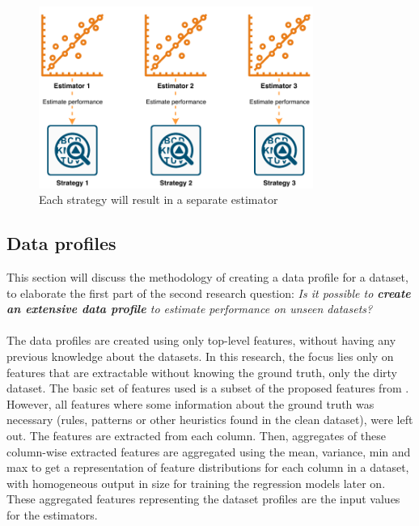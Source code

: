 \begin{figure}[h]
	\centering
	\includegraphics[width=0.8\textwidth]{thesis/Figures/Method/PerformanceEstimation-OnlyEstimate.pdf}
	\caption{Each strategy will result in a separate estimator}
	\label{fig:eachstrategy}
\end{figure}

\subsection{Data profiles}
\label{subsec:dataprofiles}
This section will discuss the methodology of creating a data profile for a dataset, to elaborate the first part of the second research question: \textit{Is  it  possible  to  \textbf{create an extensive data profile} to estimate performance on unseen datasets?}
~\\~\\The data profiles are created using only top-level features, without having any previous knowledge about the datasets. In this research, the focus lies only on features that are extractable without knowing the ground truth, only the dirty dataset. The basic set of features used is a subset of the proposed features from \cite{Mahdavi2019-pk}. However, all features where some information about the ground truth was necessary (rules, patterns or other heuristics found in the clean dataset), were left out. The features are extracted from each column. Then, aggregates of these column-wise extracted features are aggregated using the mean, variance, min and max to get a representation of feature distributions for each column in a dataset, with homogeneous output in size for training the regression models later on. These aggregated features representing the dataset profiles are the input values for the estimators. 

